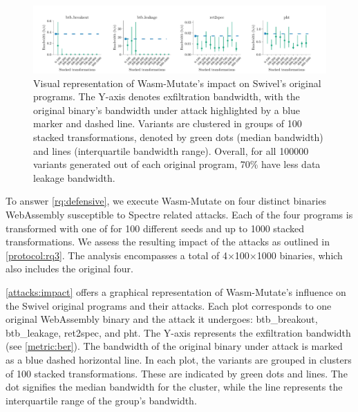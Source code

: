 \documentclass[a4paper,fleqn]{cas-dc}
\newcommand*\badge[1]{ \colorbox{red}{\color{white}#1}}
\newcommand{\tool}{{\sc Wasm-Mutate}\xspace}
\newcommand{\Wasm}{WebAssembly\xspace}
\newcommand{\wasm}{\Wasm}
\newcommand{\todo}[1]{%
\refstepcounter{todo}
\noindent\textbf{\badge{TODO}} {\color{red}#1}
\addcontentsline{td}{todo}
{\color{red}\thesection.\thetodo\xspace #1}}
\begin{document}
\subsection{\rqdefensive}

\begin{figure}
    \centering
    \includegraphics[width=\linewidth]{plots/rq3/results.rq3.pdf}
    \caption{Visual representation of \tool's impact on Swivel's original programs. The Y-axis denotes exfiltration bandwidth, with the original binary's bandwidth under attack highlighted by a blue marker and dashed line. Variants are clustered in groups of 100 stacked transformations, denoted by green dots (median bandwidth) and lines (interquartile bandwidth range). Overall, for all 100000 variants generated out of each original program, 70\% have less data leakage bandwidth.}
  \label{attacks:impact}
\end{figure}


To answer \ref{rq:defensive}, we execute \tool on four distinct binaries \wasm susceptible to Spectre related attacks. Each of the four programs is transformed with one of for 100 different seeds and up to 1000 stacked transformations. 
We assess the resulting impact of the attacks as outlined in \ref{protocol:rq3}. 
The  analysis encompasses a total of 4$\times$100$\times$1000 binaries, which also includes the original four.

\autoref{attacks:impact} offers a graphical representation of \tool's influence on the Swivel original programs and their attacks. 
Each plot corresponds to one original \wasm binary and the attack it undergoes: btb\_breakout, btb\_leakage, ret2spec, and pht.
The Y-axis represents the exfiltration bandwidth (see \autoref{metric:ber}). 
The bandwidth of the original binary under attack is marked as a blue dashed horizontal line.
In each plot, the variants are grouped in clusters of 100 stacked transformations. 
These are indicated by green dots and lines. 
The dot signifies the median bandwidth for the cluster, while the line represents the interquartile range of the group's bandwidth.
\end{document}

